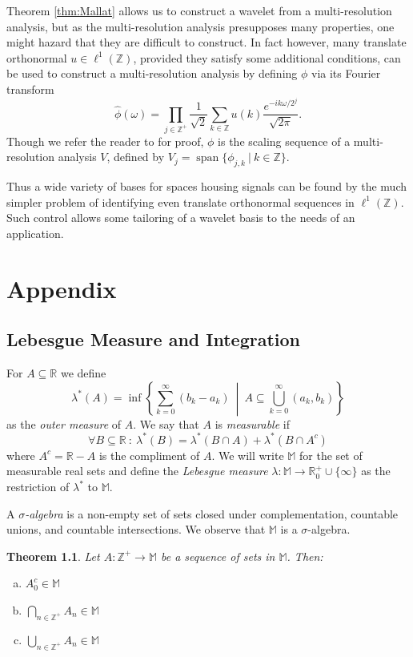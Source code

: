 \documentclass{report}
\newtheorem{MisSigmaAlgebra}[thm:ellwave]{Theorem}
\newcommand{\Z}{\mathbb{Z}}
\newcommand{\R}{\mathbb{R}}
\newcommand{\M}{\mathbb{M}}
\DeclareMathOperator{\spa}{span}
\begin{document}
Theorem \ref{thm:Mallat} allows us to construct a wavelet from a multi-resolution analysis, but as the multi-resolution analysis presupposes many properties, one might hazard that they are difficult to construct. In fact however, many translate orthonormal $u \in \ell^1(\Z)$, provided they satisfy some additional conditions, can be used to construct a multi-resolution analysis by defining $\phi$ via its Fourier transform
$$
\hat \phi (\omega) = \prod_{j\in \Z^+} \frac 1 {\sqrt 2} \sum_{k\in \Z} u(k)  \frac {e^{-ik\omega/2^j}}{\sqrt{2 \pi}}.
$$
Though we refer the reader to \cite{frazier} for proof, $\phi$ is the scaling sequence of a multi-resolution analysis $V$, defined by $V_j=\spa \{ \phi_{j,k} \ | \ k \in \Z\}$.

Thus a wide variety of bases for spaces housing signals can be found by the much simpler problem of identifying even translate orthonormal sequences in $\ell^1 (\Z)$. Such control allows some tailoring of a wavelet basis to the needs of an application.
\chapter{Appendix}
\label{ch:append}

\section{Lebesgue Measure and Integration}
For $A\subseteq \R$ we define
$$\lambda^\ast (A)= \inf \left \{ \sum\limits_{k=0}^\infty  (b_k-a_k) \ \middle | \  A\subseteq \bigcup_{k=0}^\infty(a_k,b_k) \right \}$$
as the \emph{outer measure} of $A$. We say that $A$ is \emph{measurable} if
\begin{equation}
\label{eq:measureable}
\forall B\subseteq \R \ : \ \lambda^\ast(B)=\lambda^\ast(B\cap A)+\lambda^\ast(B\cap A^c)
\end{equation}
where $A^c=\R-A$ is the compliment of $A$. We will write $\M$ for the set of measurable real sets and define the \emph{Lebesgue measure} $\lambda: \M \to \R^+_0\cup \{\infty\}$ as the restriction of $\lambda^\ast$ to $\M$.

A \emph{$\sigma$-algebra} is a non-empty set of sets closed under complementation, countable unions, and countable intersections. 
We observe that $\M$ is a $\sigma$-algebra.

\begin{MisSigmaAlgebra}
\label{thm:MisSigmaAlgebra}
Let $A: \Z^+ \to \M$ be a sequence of sets in $\M$. Then:
\begin{enumerate}[(a)]
\item $\displaystyle{A^c_0 \in \M}$
\item $\displaystyle{\bigcap_{n \in \Z^+} A_n \in \M}$
\item $\displaystyle{\bigcup_{n \in \Z^+} A_n \in \M}$
\end{enumerate}
\end{MisSigmaAlgebra}
\end{document}

